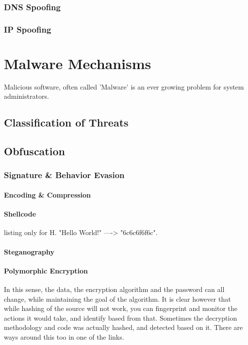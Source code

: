 \subsection{DNS Spoofing}
\subsection{IP Spoofing}



\chapter{Malware Mechanisms}
Malicious software, often called 'Malware' is an ever growing problem for system administrators.
\section{Classification of Threats}
\section{Obfuscation}
\subsection{Signature \& Behavior Evasion}


\subsubsection{Encoding \& Compression}
\subsubsection{Shellcode}
\begin{tcblisting}{listing only}
 for H. "Hello World!" ----> "\x6c\x6c\x6f\x6f\x6c". 
\end{tcblisting}

\subsubsection{Steganography}
\subsubsection{Polymorphic Encryption}
In this sense, the data, the encryption algorithm and the password can all change, while maintaining the goal of the algorithm.
It is clear however that while hashing of the source will not work, you can fingerprint and monitor the actions it would take, and identify based from that.
Sometimes the decryption methodology and code was actually hashed, and detected based on it. There are ways around this too in one of the links.

